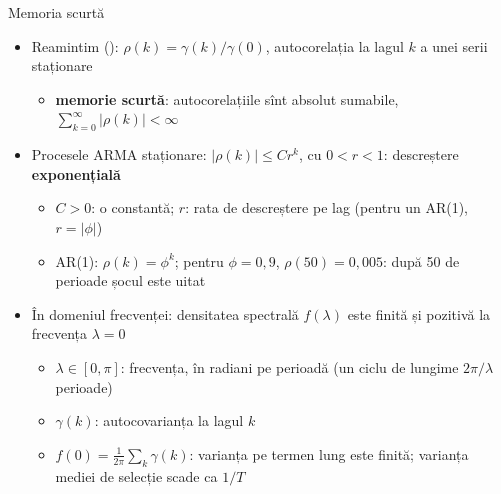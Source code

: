 \begin{frame}{Memoria scurtă}
\itemsize{\small}
\begin{itemize}
    \item Reamintim (): $\rho(k) = \gamma(k)/\gamma(0)$, autocorelația la lagul $k$ a unei serii staționare
    \begin{itemize}
        \item \textbf{memorie scurtă}: autocorelațiile sînt absolut sumabile, $\sum_{k=0}^{\infty}|\rho(k)| < \infty$
    \end{itemize}
    \item Procesele ARMA staționare: $|\rho(k)| \le C r^k$, cu $0 < r < 1$: descreștere \textbf{exponențială}
    \begin{itemize}
        \item $C > 0$: o constantă; $r$: rata de descreștere pe lag (pentru un AR(1), $r = |\phi|$)
        \item AR(1): $\rho(k) = \phi^k$; pentru $\phi = 0{,}9$, $\rho(50) = 0{,}005$: după 50 de perioade șocul este uitat
    \end{itemize}
    \item În domeniul frecvenței: densitatea spectrală $f(\lambda)$ este finită și pozitivă la frecvența $\lambda = 0$
    \begin{itemize}
        \item $\lambda \in [0, \pi]$: frecvența, în radiani pe perioadă (un ciclu de lungime $2\pi/\lambda$ perioade)
        \item $\gamma(k)$: autocovarianța la lagul $k$
        \item $f(0) = \frac{1}{2\pi}\sum_k \gamma(k)$: varianța pe termen lung este finită; varianța mediei de selecție scade ca $1/T$
    \end{itemize}
\end{itemize}
\end{frame}

